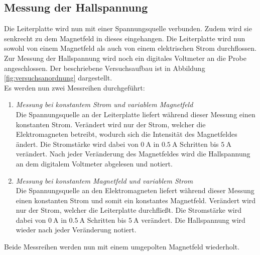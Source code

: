 \subsection{Messung der Hallspannung}
Die Leiterplatte wird nun mit einer Spannungsquelle verbunden. Zudem wird sie 
senkrecht zu dem Magnetfeld in dieses eingehangen. Die Leiterplatte wird nun sowohl von einem Magnetfeld
als auch von einem elektrischen Strom durchflossen. Zur Messung der Hallspannung wird noch ein 
digitales Voltmeter an die Probe angeschlossen. Der beschriebene Versuchsaufbau ist in Abbildung
\ref{fig:versuchsanordnung} dargestellt.\\
Es werden nun zwei Messreihen durchgeführt:
\begin{enumerate}
    \item \textit{Messung bei konstantem Strom und variablem Magnetfeld}\\
        Die Spannungsquelle an der Leiterplatte liefert während dieser Messung einen konstanten Strom. 
        Verändert wird nur der Strom, welcher die Elektromagneten betreibt, wodurch sich die Intensität
        des Magnetfeldes ändert. Die Stromstärke wird dabei von $\SI{0}{\ampere}$ in $\SI{0.5}{\ampere}$
        Schritten bis $\SI{5}{\ampere}$ verändert. Nach jeder Veränderung des Magnetfeldes wird die 
        Hallspannung an dem digitalem Voltmeter abgelesen und notiert.\\
    \item \textit{Messung bei konstantem Magnetfeld und variablem Strom}\\
        Die Spannungsquelle an den Elektromagneten liefert während dieser Messung einen konstanten Strom und 
        somit ein konstantes Magnetfeld. 
        Verändert wird nur der Strom, welcher die Leiterplatte durchfließt.
        Die Stromstärke wird dabei von $\SI{0}{\ampere}$ in $\SI{0.5}{\ampere}$
        Schritten bis $\SI{5}{\ampere}$ verändert. Die Hallspannung wird wieder nach jeder Veränderung
        notiert.\\
\end{enumerate}
Beide Messreihen werden nun mit einem umgepolten Magnetfeld wiederholt.